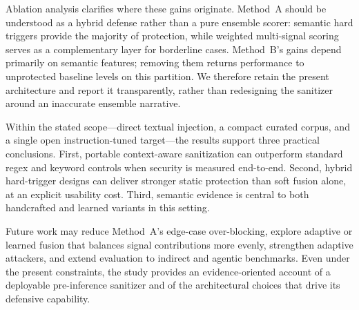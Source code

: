 ﻿\documentclass[10pt]{article}
\begin{document}
Ablation analysis clarifies where these gains originate.
Method~A should be understood as a hybrid defense rather than a pure ensemble scorer: semantic hard triggers provide the majority of protection, while weighted multi-signal scoring serves as a complementary layer for borderline cases.
Method~B's gains depend primarily on semantic features; removing them returns performance to unprotected baseline levels on this partition.
We therefore retain the present architecture and report it transparently, rather than redesigning the sanitizer around an inaccurate ensemble narrative.

Within the stated scope---direct textual injection, a compact curated corpus, and a single open instruction-tuned target---the results support three practical conclusions.
First, portable context-aware sanitization can outperform standard regex and keyword controls when security is measured end-to-end.
Second, hybrid hard-trigger designs can deliver stronger static protection than soft fusion alone, at an explicit usability cost.
Third, semantic evidence is central to both handcrafted and learned variants in this setting.

Future work may reduce Method~A's edge-case over-blocking, explore adaptive or learned fusion that balances signal contributions more evenly, strengthen adaptive attackers, and extend evaluation to indirect and agentic benchmarks.
Even under the present constraints, the study provides an evidence-oriented account of a deployable pre-inference sanitizer and of the architectural choices that drive its defensive capability.

\nocite{*}







\end{document}
